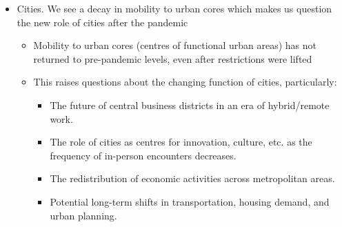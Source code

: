 \documentclass[fleqn,10pt]{letter}
\begin{document}
\begin{itemize}
\begin{itemize}
        \item Cities. We see a decay in mobility to urban cores which makes us question the new role of cities after the pandemic
        \begin{itemize}
            \item Mobility to urban cores (centres of functional urban areas) has not returned to pre-pandemic levels, even after restrictions were lifted
            \item This raises questions about the changing function of cities, particularly:
            \begin{itemize}
                \item The future of central business districts in an era of hybrid/remote work.
                \item The role of cities as centres for innovation, culture, etc. as the frequency of in-person encounters decreases.
                \item The redistribution of economic activities across metropolitan areas.
                \item Potential long-term shifts in transportation, housing demand, and urban planning.
            \end{itemize}
        \end{itemize}
    \end{itemize}
\end{itemize}
\end{document}
